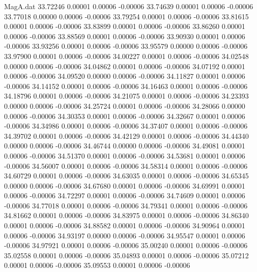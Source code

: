 \begin{filecontents}{MagA.dat}
  33.72246    0.00001    0.00006   -0.00006
  33.74639    0.00001    0.00006   -0.00006
  33.77018    0.00000    0.00006   -0.00006
  33.79254    0.00001    0.00006   -0.00006
  33.81615    0.00001    0.00006   -0.00006
  33.83899    0.00001    0.00006   -0.00006
  33.86260    0.00001    0.00006   -0.00006
  33.88569    0.00001    0.00006   -0.00006
  33.90930    0.00001    0.00006   -0.00006
  33.93256    0.00001    0.00006   -0.00006
  33.95579    0.00000    0.00006   -0.00006
  33.97900    0.00001    0.00006   -0.00006
  34.00227    0.00001    0.00006   -0.00006
  34.02548    0.00000    0.00006   -0.00006
  34.04862    0.00001    0.00006   -0.00006
  34.07192    0.00001    0.00006   -0.00006
  34.09520    0.00000    0.00006   -0.00006
  34.11827    0.00001    0.00006   -0.00006
  34.14152    0.00001    0.00006   -0.00006
  34.16463    0.00001    0.00006   -0.00006
  34.18796    0.00001    0.00006   -0.00006
  34.21075    0.00001    0.00006   -0.00006
  34.23393    0.00000    0.00006   -0.00006
  34.25724    0.00001    0.00006   -0.00006
  34.28066    0.00000    0.00006   -0.00006
  34.30353    0.00001    0.00006   -0.00006
  34.32667    0.00001    0.00006   -0.00006
  34.34986    0.00001    0.00006   -0.00006
  34.37407    0.00001    0.00006   -0.00006
  34.39702    0.00001    0.00006   -0.00006
  34.42129    0.00001    0.00006   -0.00006
  34.44340    0.00000    0.00006   -0.00006
  34.46744    0.00000    0.00006   -0.00006
  34.49081    0.00001    0.00006   -0.00006
  34.51370    0.00001    0.00006   -0.00006
  34.53681    0.00001    0.00006   -0.00006
  34.56007    0.00001    0.00006   -0.00006
  34.58314    0.00001    0.00006   -0.00006
  34.60729    0.00001    0.00006   -0.00006
  34.63035    0.00001    0.00006   -0.00006
  34.65345    0.00000    0.00006   -0.00006
  34.67680    0.00001    0.00006   -0.00006
  34.69991    0.00001    0.00006   -0.00006
  34.72297    0.00001    0.00006   -0.00006
  34.74609    0.00001    0.00006   -0.00006
  34.77018    0.00001    0.00006   -0.00006
  34.79341    0.00001    0.00006   -0.00006
  34.81662    0.00001    0.00006   -0.00006
  34.83975    0.00001    0.00006   -0.00006
  34.86340    0.00001    0.00006   -0.00006
  34.88582    0.00001    0.00006   -0.00006
  34.90964    0.00001    0.00006   -0.00006
  34.93197    0.00000    0.00006   -0.00006
  34.95547    0.00001    0.00006   -0.00006
  34.97921    0.00001    0.00006   -0.00006
  35.00240    0.00001    0.00006   -0.00006
  35.02558    0.00001    0.00006   -0.00006
  35.04893    0.00001    0.00006   -0.00006
  35.07212    0.00001    0.00006   -0.00006
  35.09553    0.00001    0.00006   -0.00006

\end{filecontents}
